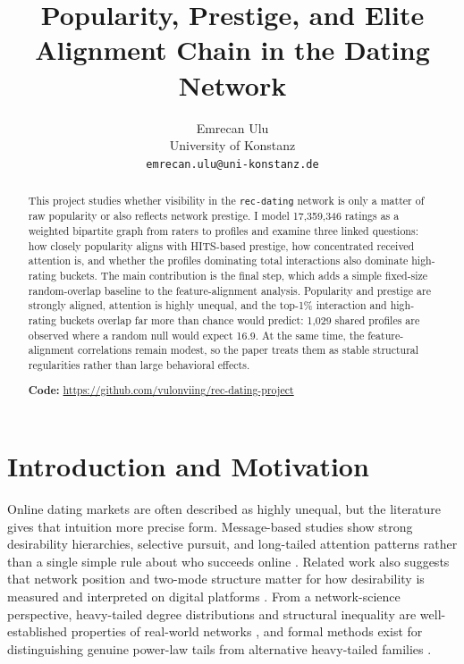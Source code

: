 \documentclass[10pt,twocolumn]{article}
\title{Popularity, Prestige, and Elite Alignment Chain in the Dating Network}
\author{Emrecan Ulu\\University of Konstanz\\\texttt{emrecan.ulu@uni-konstanz.de}}
\date{}
\begin{document}
\maketitle

\begin{abstract}
This project studies whether visibility in the \texttt{rec-dating} network is only a matter of raw popularity or also reflects network prestige. I model 17,359,346 ratings as a weighted bipartite graph from raters to profiles and examine three linked questions: how closely popularity aligns with HITS-based prestige, how concentrated received attention is, and whether the profiles dominating total interactions also dominate high-rating buckets. The main contribution is the final step, which adds a simple fixed-size random-overlap baseline to the feature-alignment analysis. Popularity and prestige are strongly aligned, attention is highly unequal, and the top-1\% interaction and high-rating buckets overlap far more than chance would predict: 1,029 shared profiles are observed where a random null would expect 16.9. At the same time, the feature-alignment correlations remain modest, so the paper treats them as stable structural regularities rather than large behavioral effects.

\noindent\textbf{Code:} \url{https://github.com/vulonviing/rec-dating-project}
\end{abstract}

\section{Introduction and Motivation}
Online dating markets are often described as highly unequal, but the literature gives that intuition more precise form. Message-based studies show strong desirability hierarchies, selective pursuit, and long-tailed attention patterns rather than a single simple rule about who succeeds online \citep{hitsch2010matching,hitsch2010click,kreager2014goodmen,bruch2018aspirational}. Related work also suggests that network position and two-mode structure matter for how desirability is measured and interpreted on digital platforms \citep{su2019gender,jung2022secret,topinkova2025tango}. From a network-science perspective, heavy-tailed degree distributions and structural inequality are well-established properties of real-world networks \citep{barabasi2016network,newman2018networks}, and formal methods exist for distinguishing genuine power-law tails from alternative heavy-tailed families \citep{clauset2009powerlaw}.
\end{document}
